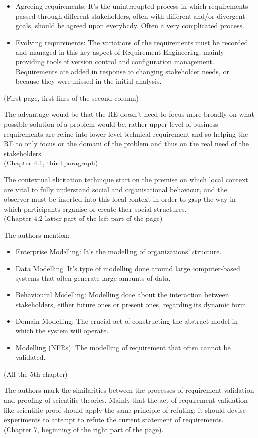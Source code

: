 \begin{elenco}
\begin{itemize}
		\item Agreeing requirements: It's the uninterrupted process in which requirements passed through different stakeholders, often with different and/or divergent goals, should be agreed upon everybody. Often a very complicated process.
		\item Evolving requirements: The variations of the requirements must be recorded and managed in this key aspect of Requirement Engineering, mainly providing tools of version control and configuration management. Requirements are added in response to changing stakeholder needs, or because they were missed in the initial analysis.
	\end{itemize}(First page, first lines of the second column)
	\item The advantage would be that the RE doesn't need to focus more broadly on what possible solution of a problem would be, rather upper level of business requirements are refine into lower level technical requirement and so helping the RE to only focus on the domani of the problem and thus on the real need of the stakeholders.\\(Chapter 4.1, third paragraph)
	\item The contextual elicitation technique start on the premise on which local context are vital to fully understand social and organisational behaviour, and the observer must be inserted into this local context in order to gasp the way in which participants organise or create their social structures.\\(Chapter 4.2 latter part of the left part of the page)
	\item The authors mention:
	\begin{itemize}
		\item Enterprise Modelling: It's the modelling of organizations' structure. 
		\item Data Modelling: It's type of modelling done around large computer-based systems that often generate large amounts of data.
		\item Behavioural Modelling: Modelling done about the interaction between stakeholders, either future ones or present ones, regarding its dynamic form.
		\item Domain Modelling: The crucial act of constructing the abstract model in which the system will operate.
		\item Modelling (NFRs): The modelling of requirement that often cannot be validated.
	\end{itemize}(All the 5th chapter)
	\item The authors mark the similarities between the processes of requirement validation and proofing of scientific theories. Mainly that the act of requirement validation like scientific  proof should apply the same principle of refuting: it should devise experiments to attempt to refute the current statement of requirements.\\(Chapter 7, beginning of the right part of the page).
	\end{elenco}
